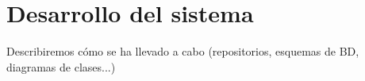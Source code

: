 \chapter{Desarrollo del sistema}

\bigskip
Describiremos cómo se ha llevado a cabo 
(repositorios, esquemas de BD, diagramas de clases...)








